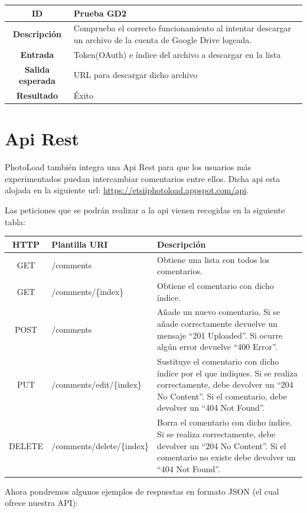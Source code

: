 \documentclass{scrartcl}
\begin{document}
\begin{tabularx}{14cm}{|c|X|}
	\hline \textbf{ID} & Prueba GD2 \\ 
	\hline \textbf{Descripción} & Comprueba el correcto funcionamiento al intentar descargar un archivo de la cuenta de Google Drive logeada.\\	 
	\hline  \textbf{Entrada}		& Token(OAuth) e índice del archivo a descargar en la lista \\ 
	\hline  \textbf{Salida esperada}			& URL para descargar dicho archivo \\
	\hline  \textbf{Resultado}			& Éxito \\
	\hline 
\end{tabularx} 
\section{Api Rest}\label{cap:apiRest}
PhotoLoad también integra una Api Rest para que los usuarios más experimentados puedan intercambiar comentarios entre ellos. Dicha api esta alojada en la siguiente url: \href{https://etsiiphotoload.appspot.com/api}{https://etsiiphotoload.appspot.com/api}. 

Las peticiones que se podrán realizar a la api vienen recogidas en la siguiente tabla:
\\

\begin{tabularx}{14cm}{|c|X|X|}
	\hline \textbf{HTTP} & \textbf{Plantilla URI} &\textbf{Descripción}\\ 
	\hline GET & /comments & Obtiene una lista con todos los comentarios.\\	 
	\hline  GET		& /comments/\{index\}& Obtiene el comentario con dicho índice.\\ 
	\hline  POST			& /comments & Añade un nuevo comentario.
	Si se añade correctamente devuelve un mensaje “201 Uploaded”.
	Si ocurre algún error devuelve “400 Error”.\\
	\hline  PUT			& /comments/edit/\{index\}	& Sustituye el comentario con dicho índice por el que indiques.
	Si se realiza correctamente, debe devolver un “204 No Content”. Si el comentario, debe devolver un “404 Not Found”.\\
	\hline  DELETE			& /comments/delete/\{index\}	& Borra el comentario con dicho índice.
	Si se realiza correctamente, debe devolver un “204 No Content”. Si el comentario no existe debe devolver un “404 Not Found”.\\
	\hline 
\end{tabularx} 
\newpage
Ahora pondremos algunos ejemplos de respuestas en formato JSON (el cual ofrece nuestra API):
\\
\end{document}
